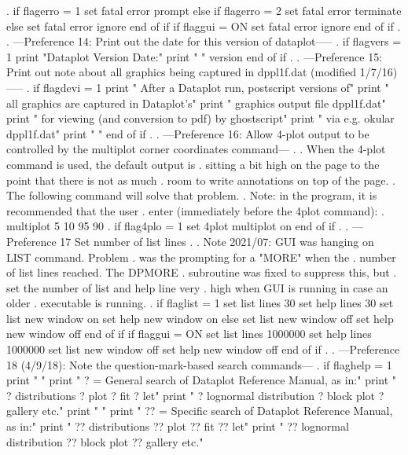 .
if flagerro = 1
   set fatal error prompt
else if flagerro = 2
   set fatal error terminate
else
   set fatal error ignore
end of if
if flaggui = ON
   set fatal error ignore
end of if
.
. ---Preference 14: Print out the date for this version of dataplot-----
.
if flagvers = 1
   print "Dataplot Version Date:"
   print " "
   version
end of if
.
. ---Preference 15: Print out note about all graphics being captured in dppl1f.dat (modified 1/7/16)-----
.
if flagdevi = 1
   print "      After a Dataplot run, postscript versions of"
   print "      all graphics are captured in Dataplot's"
   print "      graphics output file     dppl1f.dat"
   print "      for viewing (and conversion to pdf) by ghostscript"
   print "      via e.g.    okular dppl1f.dat"
   print " "
end of if
.
. ---Preference 16: Allow 4-plot output to be controlled by the    multiplot corner coordinates    command---
.
.    When the 4-plot command is used, the default output is
.    sitting a bit high on the page to the point that there is not as much
.    room to write annotations on top of the page.
.    The following command will solve that problem.
.    Note: in the program, it is recommended that the user
.          enter (immediately before the 4plot command):
.             multiplot 5 10 95 90
.
if flag4plo = 1
   set 4plot multiplot on
end of if
.
. ---Preference 17 Set number of list lines
.
.    Note 2021/07: GUI was hanging on LIST command.  Problem
.                  was the prompting for a "MORE" when the
.                  number of list lines reached.  The DPMORE
.                  subroutine was fixed to suppress this, but
.                  set the number of list and help line very
.                  high when GUI is running in case an older
.                  executable is running.
.
if flaglist = 1
   set list lines 30
   set help lines 30
   set list new window on
   set help new window on
else
   set list new window off
   set help new window off
end of if
if flaggui = ON
   set list lines 1000000
   set help lines 1000000
   set list new window off
   set help new window off
end of if
.
. ---Preference 18 (4/9/18): Note the question-mark-based search commands---
.
if flaghelp = 1
   print " "
   print "      ? = General  search of Dataplot Reference Manual, as in:"
   print "          ? distributions   ? plot   ? fit   ? let"
   print "          ? lognormal distribution   ? block plot   ? gallery   etc."
   print " "
   print "     ?? = Specific search of Dataplot Reference Manual, as in:"
   print "          ?? distributions   ?? plot   ?? fit   ?? let"
   print "          ?? lognormal distribution    ?? block plot   ?? gallery   etc."
